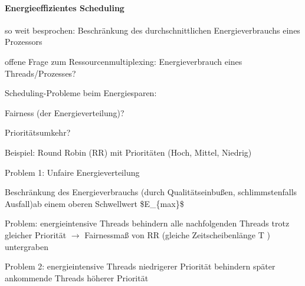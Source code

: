 \documentclass[a4paper]{article}
\begin{document}
\begin{multicols}{3}
    \paragraph{Energieeffizientes Scheduling}
    \begin{itemize*}
        \item so weit besprochen: Beschränkung des durchschnittlichen Energieverbrauchs eines Prozessors
        \item offene Frage zum Ressourcenmultiplexing: Energieverbrauch eines Threads/Prozesses?
        \item Scheduling-Probleme beim Energiesparen:
        \begin{enumerate*}
            \item Fairness (der Energieverteilung)?
            \item Prioritätsumkehr?
        \end{enumerate*}
        \item Beispiel: Round Robin (RR) mit Prioritäten (Hoch, Mittel, Niedrig)
        \item Problem 1: Unfaire Energieverteilung
        \begin{itemize*}
            \item Beschränkung des Energieverbrauchs (durch Qualitätseinbußen, schlimmstenfalls Ausfall)ab einem oberen Schwellwert \$E\_\{max\}\$
            \item Problem: energieintensive Threads behindern alle nachfolgenden Threads trotz gleicher Priorität $\rightarrow$ Fairnessmaß von RR (gleiche Zeitscheibenlänge T ) untergraben
            \item Problem 2: energieintensive Threads niedrigerer Priorität behindern
            später ankommende Threads höherer Priorität
        \end{itemize*}
    \end{itemize*}


\end{multicols}
\end{document}
